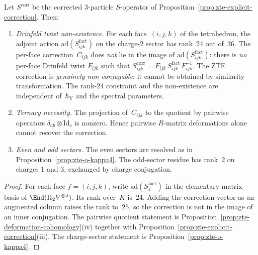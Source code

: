 \begin{proposition}
\label{prop:zte-nonperturbative-completion}
Let $S^{\mathrm{corr}}$ be the corrected $3$-particle $S$-operator of Proposition~\textup{\ref{prop:zte-explicit-correction}}. Then:
\begin{enumerate}[label=\textup{(\roman*)}]
 \item \emph{Drinfeld twist non-existence.} For each face~$(i,j,k)$ of the tetrahedron, the adjoint action $\mathrm{ad}(S^{\mathrm{fact}}_{ijk})$ on the charge-$2$ sector has rank~$24$ out of~$36$. The per-face correction~$C_{ijk}$ does \emph{not} lie in the image of $\mathrm{ad}(S^{\mathrm{fact}}_{ijk})$: there is \emph{no} per-face Drinfeld twist $F_{ijk}$ such that $S^{\mathrm{corr}}_{ijk} = F_{ijk}\, S^{\mathrm{fact}}_{ijk}\, F_{ijk}^{-1}$. The ZTE correction is \emph{genuinely non-conjugable}: it cannot be obtained by similarity transformation. The rank-$24$ constraint and the non-existence are independent of~$\hbar_{\mathrm{Y}}$ and the spectral parameters.

 \item \emph{Ternary necessity.} The projection of~$C_{ijk}$ to the quotient by pairwise operators $\delta_{ab}\otimes\mathrm{Id}_c$ is nonzero. Hence pairwise $R$-matrix deformations alone cannot recover the correction.

 \item \emph{Even and odd sectors.} The even sectors are resolved as in Proposition~\ref{prop:zte-o-kappa4}. The odd-sector residue has rank~$2$ on charges $1$ and $3$, exchanged by charge conjugation.
\end{enumerate}
\end{proposition}

\begin{proof}
For each face $f=(i,j,k)$, write $\mathrm{ad}(S^{\mathrm{fact}}_f)$ in the elementary matrix basis of $\End(\Pi_2V^{\otimes4})$. Its rank over~$K$ is~$24$. Adding the correction vector as an augmented column raises the rank to~$25$, so the correction is not in the image of an inner conjugation. The pairwise quotient statement is Proposition~\ref{prop:zte-deformation-cohomology}(iv) together with Proposition~\ref{prop:zte-explicit-correction}(iii). The charge-sector statement is Proposition~\ref{prop:zte-o-kappa4}.
\end{proof}

